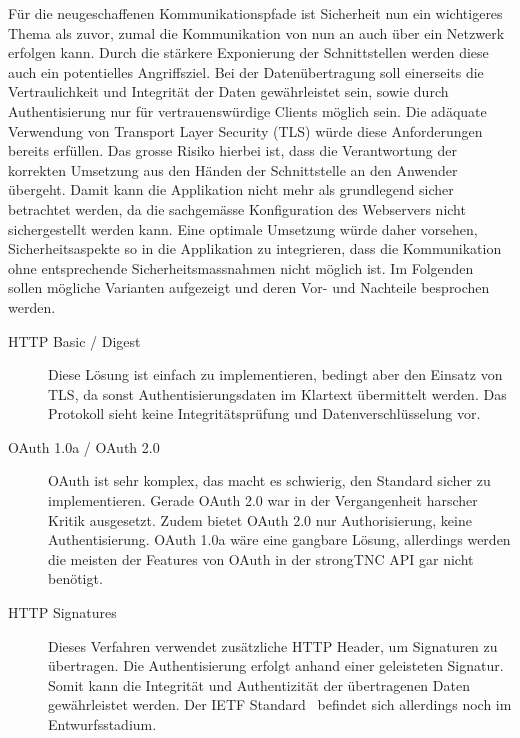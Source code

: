 Für die neugeschaffenen Kommunikationspfade ist Sicherheit nun ein wichtigeres
Thema als zuvor, zumal die Kommunikation von nun an auch über ein Netzwerk
erfolgen kann. Durch die stärkere Exponierung der Schnittstellen werden diese
auch ein potentielles Angriffsziel. Bei der Datenübertragung soll einerseits die
Vertraulichkeit und Integrität der Daten gewährleistet sein, sowie durch
Authentisierung nur für vertrauenswürdige Clients möglich sein. Die adäquate
Verwendung von Transport Layer Security (TLS) würde diese Anforderungen bereits
erfüllen. Das grosse Risiko hierbei ist, dass die Verantwortung der korrekten
Umsetzung aus den Händen der Schnittstelle an den Anwender übergeht. Damit kann
die Applikation nicht mehr als grundlegend sicher betrachtet werden, da die
sachgemässe Konfiguration des Webservers nicht sichergestellt werden kann. Eine
optimale Umsetzung würde daher vorsehen, Sicherheitsaspekte so in die
Applikation zu integrieren, dass die Kommunikation ohne entsprechende
Sicherheitsmassnahmen nicht möglich ist. Im Folgenden sollen mögliche Varianten
aufgezeigt und deren Vor- und Nachteile besprochen werden.

\begin{description}

\item [HTTP Basic / Digest] Diese Lösung ist einfach zu implementieren, bedingt
aber den Einsatz von TLS, da sonst Authentisierungsdaten im Klartext übermittelt
werden. Das Protokoll sieht keine Integritätsprüfung und Datenverschlüsselung
vor.

\item [OAuth 1.0a / OAuth 2.0] OAuth ist sehr komplex, das macht es schwierig,
den Standard sicher zu implementieren. Gerade OAuth 2.0 war in der Vergangenheit
harscher Kritik ausgesetzt\cite{hammer2012, homakov2013}. Zudem bietet OAuth 2.0
nur Authorisierung, keine Authentisierung. OAuth 1.0a wäre eine gangbare Lösung,
allerdings werden die meisten der Features von OAuth in der strongTNC API gar
nicht benötigt.

\item [HTTP Signatures] Dieses Verfahren verwendet zusätzliche HTTP Header, um
Signaturen zu übertragen. Die Authentisierung erfolgt anhand einer geleisteten
Signatur. Somit kann die Integrität und Authentizität der übertragenen Daten
gewährleistet werden. Der IETF Standard~\cite{httpsignatures2014} befindet sich allerdings noch im
Entwurfsstadium.

\end{description}

